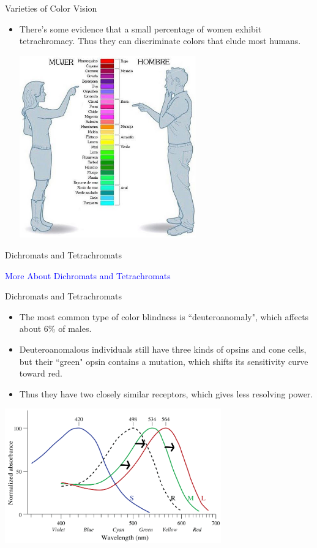 \documentclass{beamer}
\begin{document}
\begin{frame}{Varieties of Color Vision}
   \begin{itemize}
      \item There's some evidence that a small percentage of women exhibit tetrachromacy. Thus they can discriminate colors that elude most humans.
   \begin{center}
      \includegraphics[width=0.6\textwidth]{figures/womenvsmencolors.jpg}
   \end{center}
   \end{itemize}
\end{frame}

\begin{frame}{Dichromats and Tetrachromats}
   \begin{center}
      \Huge \textcolor{blue}{More About Dichromats and Tetrachromats}
   \end{center}
\end{frame}

\begin{frame}{Dichromats and Tetrachromats}
   \begin{itemize}
      \item The most common type of color blindness is ``deuteroanomaly", which affects about 6\% of males.
      \item Deuteroanomalous individuals still have three kinds of opsins and cone cells, but their ``green" opsin contains a mutation, which shifts its sensitivity curve toward red.
      \item Thus they have two closely similar receptors, which gives less resolving power.
   \end{itemize}
   \begin{center}
      \includegraphics[width=0.7\textwidth]{figures/deuteroanomaly.png}
   \end{center}
\end{frame}
\end{document}
